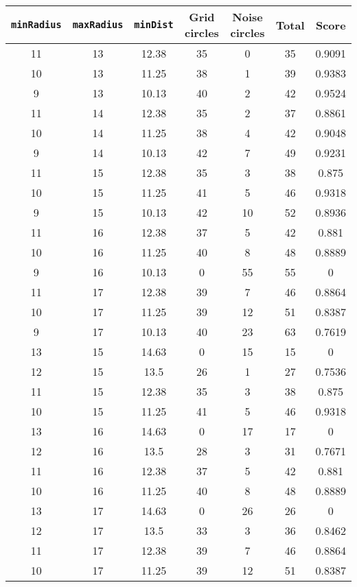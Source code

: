 \documentclass[letterpaper, 12pt]{article}
\begin{document}
\begin{longtable}{|c|c|c|c|c|c|c|}
\hline
\textbf{\texttt{minRadius}} & \textbf{\texttt{maxRadius}} & \textbf{\texttt{minDist}} & \textbf{Grid circles} & \textbf{Noise circles} & \textbf{Total} & \textbf{Score} \\
\hline
11 & 13 & 12.38 & 35 & 0 & 35 & 0.9091 \\
\hline
10 & 13 & 11.25 & 38 & 1 & 39 & 0.9383 \\
\hline
9 & 13 & 10.13 & 40 & 2 & 42 & 0.9524 \\
\hline
11 & 14 & 12.38 & 35 & 2 & 37 & 0.8861 \\
\hline
10 & 14 & 11.25 & 38 & 4 & 42 & 0.9048 \\
\hline
9 & 14 & 10.13 & 42 & 7 & 49 & 0.9231 \\
\hline
11 & 15 & 12.38 & 35 & 3 & 38 & 0.875 \\
\hline
10 & 15 & 11.25 & 41 & 5 & 46 & 0.9318 \\
\hline
9 & 15 & 10.13 & 42 & 10 & 52 & 0.8936 \\
\hline
11 & 16 & 12.38 & 37 & 5 & 42 & 0.881 \\
\hline
10 & 16 & 11.25 & 40 & 8 & 48 & 0.8889 \\
\hline
9 & 16 & 10.13 & 0 & 55 & 55 & 0 \\
\hline
11 & 17 & 12.38 & 39 & 7 & 46 & 0.8864 \\
\hline
10 & 17 & 11.25 & 39 & 12 & 51 & 0.8387 \\
\hline
9 & 17 & 10.13 & 40 & 23 & 63 & 0.7619 \\
\hline
13 & 15 & 14.63 & 0 & 15 & 15 & 0 \\
\hline
12 & 15 & 13.5 & 26 & 1 & 27 & 0.7536 \\
\hline
11 & 15 & 12.38 & 35 & 3 & 38 & 0.875 \\
\hline
10 & 15 & 11.25 & 41 & 5 & 46 & 0.9318 \\
\hline
13 & 16 & 14.63 & 0 & 17 & 17 & 0 \\
\hline
12 & 16 & 13.5 & 28 & 3 & 31 & 0.7671 \\
\hline
11 & 16 & 12.38 & 37 & 5 & 42 & 0.881 \\
\hline
10 & 16 & 11.25 & 40 & 8 & 48 & 0.8889 \\
\hline
13 & 17 & 14.63 & 0 & 26 & 26 & 0 \\
\hline
12 & 17 & 13.5 & 33 & 3 & 36 & 0.8462 \\
\hline
11 & 17 & 12.38 & 39 & 7 & 46 & 0.8864 \\
\hline
10 & 17 & 11.25 & 39 & 12 & 51 & 0.8387 \\

\end{longtable}
\end{document}
